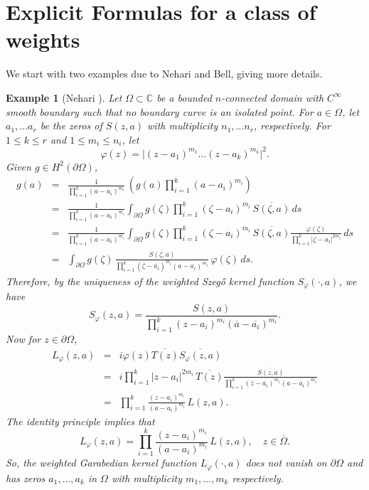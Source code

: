 \documentclass[11pt, reqno]{amsart}
\newtheorem{exam}[thm]{Example}
\numberwithin{equation}{section}
\newcommand{\Om}{\Omega}
\begin{document}
    \section{Explicit Formulas for a class of weights}
	
	We start with two examples due to Nehari and Bell, giving more details.
	
	\begin{exam}[Nehari \cite{Nehari}]
		Let $\Omega\subset\mathbb{C}$ be a bounded $n$-connected domain with $C^{\infty}$ smooth boundary such that no boundary curve is an isolated point. For $a\in\Om$, let $a_1,\ldots a_r$ be the zeros of $S(z,a)$ with multiplicity $n_1,\ldots n_r$, respectively. For $1\leq k\leq r$ and $1\leq m_i\leq n_i$, let
		\[
		\varphi(z) = \vert (z - a_1)^{m_1} \ldots (z-a_k)^{m_k} \vert^2.
		\]
		Given $g\in H^2(\partial\Omega)$,
		\begin{eqnarray*}
			g(a) 
			&=&
			\frac{1}{\prod_{i=1}^k (a-a_i)^{m_i}} \, \left( g(a) \prod_{i=1}^k (a-a_i)^{m_i} \right)
			\\&=&
			\frac{1}{\prod_{i=1}^k (a-a_i)^{m_i}} 
			\int_{\partial\Om} g(\zeta) \prod_{i=1}^k (\zeta-a_i)^{m_i} \,\overline{S(\zeta,a)} \,ds
			\\&=&
			\frac{1}{\prod_{i=1}^k (a-a_i)^{m_i}} 
			\int_{\partial\Om} g(\zeta) \prod_{i=1}^k (\zeta-a_i)^{m_i} \,\overline{S(\zeta,a)} \frac{\varphi(\zeta)}{\prod_{i=1}^k \vert \zeta - a_i\vert^{2 m_i}}\,ds
			\\&=&
			\int_{\partial\Om} g(\zeta) \,\frac{\overline{S(\zeta,a)}}{\prod_{i=1}^k (\overline{\zeta} - \overline{a_i})^{m_i}(a-a_i)^{m_i}} \,\varphi(\zeta)\,ds.
		\end{eqnarray*}
		Therefore, by the uniqueness of the weighted Szeg\H{o} kernel function $S_{\varphi}(\cdot, a)$, we have
		\[
		S_{\varphi}(z,a) = \frac{S(z,a)}{\prod_{i=1}^k (z-a_i)^{m_i} (\overline{a}-\overline{a_i})^{m_i}}.
		\]
		Now for $z\in\partial\Omega$,
		\begin{eqnarray*}
			L_{\varphi}(z, a) 
			&=&
			i \varphi(z) \overline{T(z)} \overline{S_{\varphi}(z,a)} 
			\\&=&
			i \prod_{i=1}^{k} \vert z-a_i\vert^{2m_i} \,\overline{T(z)}  \frac{\overline{S(z,a)}}{\prod_{i=1}^k (\overline{z}-\overline{a_i})^{m_i} (a-a_i)^{m_i}}
			\\&=&
			\prod_{i=1}^{k}\frac{(z-a_i)^{m_i}}{(a-a_i)^{m_i}} \,L(z,a).
		\end{eqnarray*}
		The identity principle implies that
		\[
		L_{\varphi}(z, a) = \prod_{i=1}^{k}\frac{(z-a_i)^{m_i}}{(a-a_i)^{m_i}} \,L(z,a), \quad z\in\overline{\Om}.
		\]
		So, the weighted Garabedian kernel function $L_{\varphi}(\cdot,a)$ does not vanish on $\partial\Om$ and has zeros $a_1,\ldots, a_k$ in $\Om$ with multiplicity $m_1,\ldots, m_k$ respectively. 
		

\end{exam}
\end{document}
